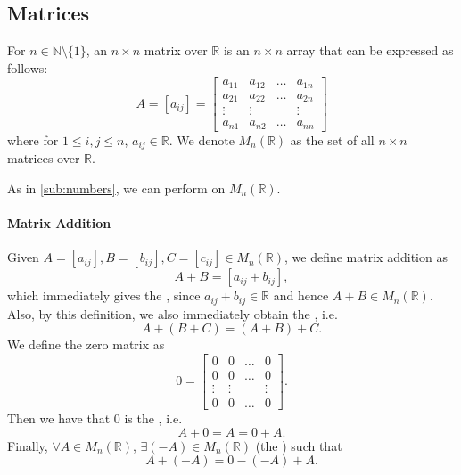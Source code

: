 \documentclass[notoc,notitlepage]{tufte-book}
\begin{document}

\subsection{Matrices}
  \label{sub:matrices}

For $n \in \mathbb{N} \setminus \{1\}$, an $n \times n$ matrix over $\mathbb{R}$  is an $n \times n$ array that can be expressed as follows:
\begin{equation*}
  A = [a_{ij}] = \begin{bmatrix}
    a_{11} & a_{12} & \hdots & a_{1n} \\
    a_{21} & a_{22} & \hdots & a_{2n} \\
    \vdots & \vdots &        & \vdots \\
    a_{n1} & a_{n2} & \hdots & a_{nn}
  \end{bmatrix}
\end{equation*}
where for $1 \leq i, j \leq n$, $a_{ij} \in \mathbb{R}$. We denote $M_n(\mathbb{R})$ as the set of all $n \times n$ matrices over $\mathbb{R}$.

As in \cref{sub:numbers}, we can perform  on $M_n(\mathbb{R})$.

\paragraph{Matrix Addition} Given $A = [a_{ij}], B = [b_{ij}], C = [c_{ij}] \in M_n(\mathbb{R})$, we define matrix addition as
\begin{equation*}
  A + B = [a_{ij} + b_{ij}],
\end{equation*}
which immediately gives the , since $a_{ij} + b_{ij} \in \mathbb{R}$ and hence $A + B \in M_n(\mathbb{R})$. Also, by this definition, we also immediately obtain the , i.e.
\begin{equation*}
  A + (B + C) = (A + B) + C.
\end{equation*}
We define the zero matrix as
\begin{equation*}
  0 = \begin{bmatrix}
    0      &   0    & \hdots &   0 \\
    0      &   0    & \hdots &   0 \\
    \vdots & \vdots &        & \vdots \\
    0      &   0    & \hdots &   0
  \end{bmatrix}.
\end{equation*}
Then we have that $0$ is the , i.e.
\begin{equation*}
  A + 0 = A = 0 + A.
\end{equation*}
Finally, $\forall A \in M_n(\mathbb{R})$, $\exists (-A) \in M_n(\mathbb{R})$ (the ) such that
\begin{equation*}
  A + (-A) = 0 - (-A) + A.
\end{equation*}
\end{document}
